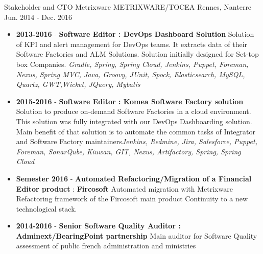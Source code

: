 \begin{cventries}
    \cventry
    {Stakeholder and CTO Metrixware} %
    {METRIXWARE/TOCEA} %
    {Rennes, Nanterre} %
    {Jun. 2014 - Dec. 2016} %
    {
        \begin{itemize}
            \item {\textbf{2013-2016 } - \textbf{Software Editor : DevOps Dashboard Solution} Solution of KPI and alert management for DevOps teams. It extracts data of their Software Factories and ALM Solutions. Solution initially designed for Set-top box Companies. \newline \textit{Gradle, Spring, Spring Cloud, Jenkins, Puppet, Foreman, Nexus, Spring MVC, Java, Groovy, JUnit, Spock, Elasticsearch, MySQL, Quartz, GWT,Wicket, JQuery, Mybatis}}
            \item {\textbf{2015-2016 } - \textbf{Software Editor : Komea Software Factory solution} Solution to produce on-demand Software Factories in a cloud environment. This solution was fully integrated with our DevOps Dashboarding solution. Main benefit of that solution is to automate the common tasks of Integrator and Software Factory maintainers\newline \textit{Jenkins, Redmine, Jira, Salesforce, Puppet, Foreman, SonarQube, Kiuwan, GIT, Nexus, Artifactory, Spring, Spring Cloud}}
            \item \textbf{Semester 2016} - {\textbf{\textbf{Automated Refactoring/Migration} of a Financial Editor product} : \textbf{Fircosoft} Automated migration with Metrixware Refactoring framework of the Fircosoft main product Continuity to a new technological stack. }
            \item { \textbf{2014-2016 } - \textbf{Senior Software Quality Auditor : Adminext/BearingPoint partnership } Main auditor for Software Quality assessment of public french administration and ministries}

\end{itemize}}
\end{cventries}
